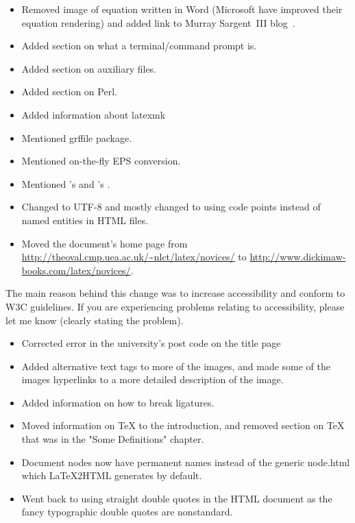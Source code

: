 \begin{itemize}
\item Removed image of equation written in Word (Microsoft have
improved their equation rendering) and added link to
Murray Sargent~III blog~\cite{sargentiii}.
\item Added section on what a terminal/command prompt is.
\item Added section on auxiliary files.
\item Added section on Perl.
\item Added information about latexmk
\item Mentioned grffile package.
\item Mentioned on-the-fly EPS conversion.
\item Mentioned 's  and 's
.
\item Changed to UTF-8 and mostly changed to using code points
instead of named entities in HTML files.
\item Moved the document's home page from
\url{http://theoval.cmp.uea.ac.uk/~nlct/latex/novices/} to
\url{http://www.dickimaw-books.com/latex/novices/}.
\end{itemize}


The main reason behind this change was to increase accessibility and
conform to W3C guidelines. If you are experiencing problems relating
to accessibility, please let me know (clearly stating the problem).
\begin{itemize}
\item Corrected error in the university's post code on the
title page
\item Added alternative text tags to more of the images, and made
some of the images hyperlinks to a more detailed description of the
image.
\item Added information on how to break ligatures.
\item Moved information on TeX to the introduction, and removed
section on TeX that was in the "Some Definitions" chapter.
\item Document nodes now have permanent names instead of the generic
node.html which \LaTeX2HTML generates by default.
\item Went back to using straight double quotes in the HTML document
as the fancy typographic double quotes are nonstandard.

\end{itemize}


